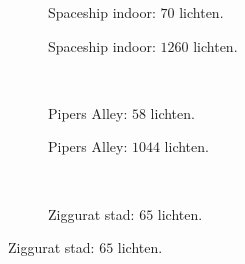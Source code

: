 \begin{figure}[p]
  \begin{adjustbox}{minipage=\textwidth, scale=0.6}
    \begin{subfigure}[b]{0.83\textwidth}
      \centering
      \def\svgwidth{\textwidth}
      
      \caption{Spaceship indoor: $70$ lichten.}
      \label{fig:hs-seed-construction-time::si-low}
    \end{subfigure}
  \end{adjustbox} %
  \begin{adjustbox}{minipage=\textwidth, scale=0.6}
    \begin{subfigure}[b]{0.83\textwidth}
      \centering
      \def\svgwidth{\textwidth}
      
      \caption{Spaceship indoor: $1260$ lichten.}
      \label{fig:hs-seed-construction-time::si-high}
    \end{subfigure}
  \end{adjustbox} \\
  \begin{adjustbox}{minipage=\textwidth, scale=0.6}
    \begin{subfigure}[b]{0.83\textwidth}
      \centering
      \def\svgwidth{\textwidth}
      
      \caption{Pipers Alley: $58$ lichten.}
      \label{fig:hs-seed-construction-time::pa-low}
    \end{subfigure}
  \end{adjustbox} %
  \begin{adjustbox}{minipage=\textwidth, scale=0.6}
    \begin{subfigure}[b]{0.83\textwidth}
      \centering
      \def\svgwidth{\textwidth}
      
      \caption{Pipers Alley: $1044$ lichten.}
      \label{fig:hs-seed-construction-time::pa-high}
    \end{subfigure}
  \end{adjustbox} \\
  \begin{adjustbox}{minipage=\textwidth, scale=0.6}
    \begin{subfigure}[b]{0.83\textwidth}
      \centering
      \def\svgwidth{\textwidth}
      
      \caption{Ziggurat stad: $65$ lichten.}
      \label{fig:hs-seed-construction-time::zc-low}

\end{subfigure}
\end{adjustbox}
\end{figure}
